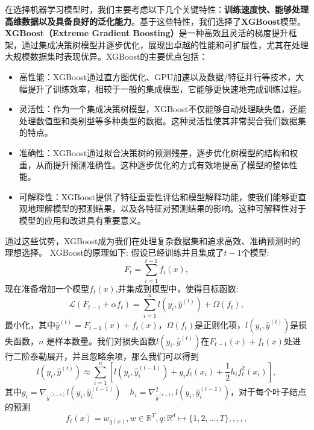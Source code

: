 在选择机器学习模型时，我们主要考虑以下几个关键特性：\textbf{训练速度快、能够处理高维数据以及具备良好的泛化能力}。基于这些特性，我们选择了\textbf{XGBoost}模型。\textbf{XGBoost（Extreme Gradient Boosting）}\cite{10.1145/2939672.2939785}是一种高效且灵活的梯度提升框架，通过集成决策树模型并逐步优化，展现出卓越的性能和可扩展性，尤其在处理大规模数据集时表现优异。XGBoost的主要优点包括：
\begin{itemize}
	\item 高性能：XGBoost通过直方图优化、GPU加速以及数据/特征并行等技术，大幅提升了训练效率，相较于一般的集成模型，它能够更快速地完成训练过程。
	\item 灵活性：作为一个集成决策树模型，XGBoost不仅能够自动处理缺失值，还能处理数值型和类别型等多种类型的数据。这种灵活性使其非常契合我们数据集的特点。
	\item 准确性：XGBoost通过拟合决策树的预测残差，逐步优化树模型的结构和权重，从而提升预测准确性。这种逐步优化的方式有效地提高了模型的整体性能。
	\item 可解释性：XGBoost提供了特征重要性评估和模型解释功能，使我们能够更直观地理解模型的预测结果，以及各特征对预测结果的影响。这种可解释性对于模型的应用和改进具有重要意义。
\end{itemize}
通过这些优势，XGBoost成为我们在处理复杂数据集和追求高效、准确预测时的理想选择。
XGBoost的原理如下:
假设已经训练并且集成了$t-1$个模型:
\begin{equation}
	F_t=\sum_{i=1}^{t-1}f_i(x),
\end{equation}
现在准备增加一个模型$f_t(x)$,并集成到模型中，使得目标函数:
\begin{equation}
	\mathcal{L}(F_{t-1}+\alpha f_t)=\sum_{i=1}^{n}l(y_i,\hat{y}^{(t)})+\Omega(f_t),
\end{equation}
最小化，其中$\hat{y}^{(t)}=F_{t-1}(x)+f_t(x)$，$\Omega(f_t)$是正则化项，$l(y_i,\hat{y}^{(t)})$是损失函数，$n$ 是样本数量。我们对损失函数$l(y_i,\hat{y}^{(t)})$在$F_{t-1}(x)+f_t(x)$处进行二阶泰勒展开，并且忽略余项，那么我们可以得到 \begin{equation}
	l(y_i,\hat{y}^{(t)})\approx\sum_{i=1}^{n}\left[l\left(y_{i},\hat{y}_{i}^{(t-1)}\right)+g_{i}f_{t}(x_{i})+\frac{1}{2}h_{i}f_{t}^{2}(x_{i})\right],
\end{equation}
其中$g_i=\nabla_{\hat{y}^{(t-1)}}l\left(y_i,\hat{y}_i^{(t-1)}\right)\quad h_i=\nabla_{\hat{y}^{(t-1)}}^2l\left(y_i,\hat{y}_i^{(t-1)}\right)$，对于每个叶子结点的预测
\begin{equation}
	f_t(x)=w_{q(x)},w\in\mathbb{R}^T,q\colon\mathbb{R}^d\mapsto\{1,2,...,T\},,,,,
\end{equation}
